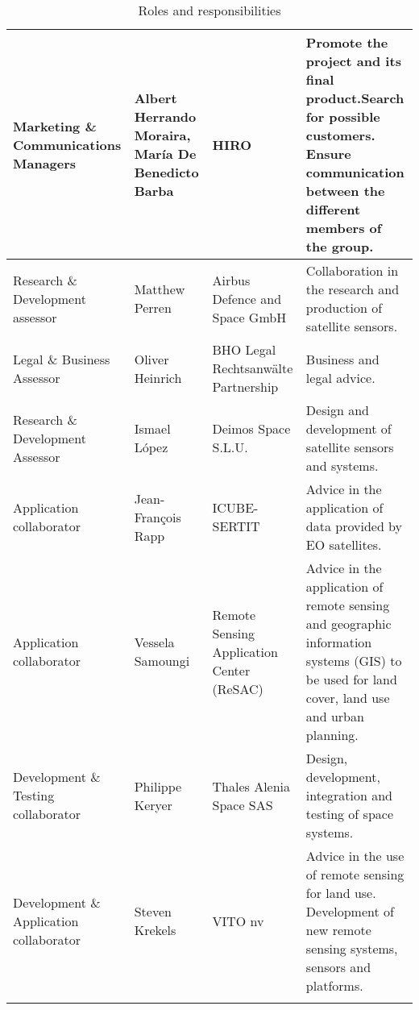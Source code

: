 \begin{longtable}{>{\raggedright\arraybackslash}p{2.5cm} >{\raggedright\arraybackslash}p{2.8cm} >{\raggedright\arraybackslash}p{3cm}>{\raggedright\arraybackslash}p{5cm}}
		Marketing \& Communications Managers & Albert Herrando Moraira, \newline  María De Benedicto Barba & HIRO & Promote the project and its final product.\newline Search for possible customers.\newline 
		Ensure communication between the different members of the group. \\ \midrule

		Research \& Development assessor & Matthew Perren & Airbus Defence and Space GmbH & Collaboration in the research and production of satellite sensors. \\ \midrule

		Legal \& Business Assessor & Oliver Heinrich & BHO Legal Rechtsanwälte Partnership & Business and legal advice. \\ \midrule

		Research \& Development Assessor & Ismael López & Deimos Space S.L.U. & Design and development of satellite sensors and systems. \\ \midrule

		Application collaborator & Jean-François Rapp & ICUBE-SERTIT & Advice in the application of data provided by EO satellites. \\ \midrule

		Application collaborator & Vessela Samoungi & Remote Sensing Application Center (ReSAC) & Advice in the application of remote sensing and geographic information systems (GIS) to be used for land cover, land use and urban planning. \\ \midrule

		Development \& Testing collaborator & Philippe Keryer & Thales Alenia Space SAS & Design, development, integration and testing of space systems. \\ \midrule

		Development \& Application collaborator & Steven Krekels & VITO nv & Advice in the use of remote sensing for land use. Development of new remote sensing systems, sensors and platforms. 
		\\ \bottomrule[2pt]

		\caption{Roles and responsibilities}
		\label{table_roles}	
	\end{longtable}
